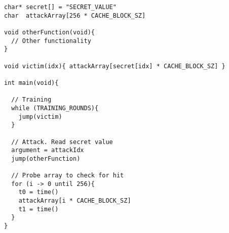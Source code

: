 \begin{lstlisting}[style=column-code, label={code:spectre-v2-pseudo}, caption=Psuedocode of Bounds Check Bypass Attack]
char* secret[] = "SECRET_VALUE"
char  attackArray[256 * CACHE_BLOCK_SZ]

void otherFunction(void){
  // Other functionality    
}

void victim(idx){ attackArray[secret[idx] * CACHE_BLOCK_SZ] }

int main(void){
  
  // Training
  while (TRAINING_ROUNDS){
    jump(victim)
  }

  // Attack. Read secret value
  argument = attackIdx
  jump(otherFunction)

  // Probe array to check for hit
  for (i -> 0 until 256){
    t0 = time()
    attackArray[i * CACHE_BLOCK_SZ]
    t1 = time()
  }
}
\end{lstlisting}

